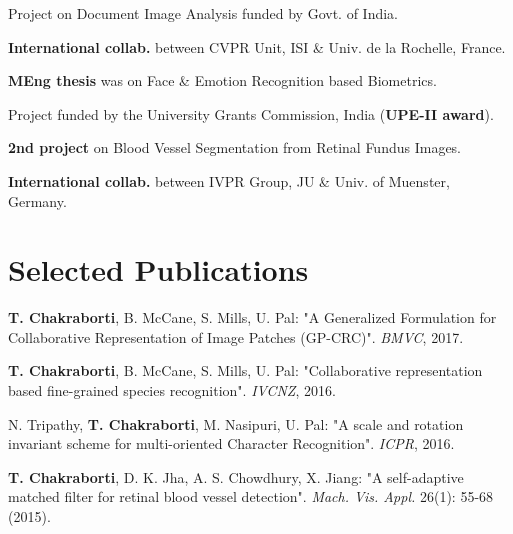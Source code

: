 \documentclass[letterpaper]{tap-resume}
\begin{document}
\begin{minipage}[t]{0.66\textwidth}
\begin{tightitemize}
\item Project on Document Image Analysis funded by Govt. of India.
\item \textbf{International collab.} between CVPR Unit, ISI \& Univ. de la Rochelle, France.
\end{tightitemize}


\sectionspace
{}


\begin{tightitemize}
\item \textbf{MEng thesis} was on Face \& Emotion Recognition based Biometrics.
\item Project funded by the University Grants Commission, India (\textbf{UPE-II award}).
\item \textbf{2nd project} on Blood Vessel Segmentation from Retinal Fundus Images.
\item \textbf{International collab.} between IVPR Group, JU \& Univ. of Muenster, Germany.
\end{tightitemize}

\sectionspace

\section{Selected Publications}


\vspace{\parsep}
\begin{tightenumerate}

\item \textbf{T. Chakraborti}, B. McCane, S. Mills, U. Pal: "A Generalized Formulation for Collaborative Representation of Image Patches (GP-CRC)". \emph{BMVC}, 2017.
\item \textbf{T. Chakraborti}, B. McCane, S. Mills, U. Pal: "Collaborative representation based fine-grained species recognition". \emph{IVCNZ}, 2016.
\item N. Tripathy, \textbf{T. Chakraborti}, M. Nasipuri, U. Pal: "A scale and rotation invariant scheme for multi-oriented Character Recognition". \emph{ICPR}, 2016.
\item \textbf{T. Chakraborti}, D. K. Jha, A. S. Chowdhury, X. Jiang: "A self-adaptive matched filter for retinal blood vessel detection". \emph{Mach. Vis. Appl.} 26(1): 55-68 (2015).
\end{tightenumerate}
\vspace{\parsep}




\end{minipage}
\end{document}
